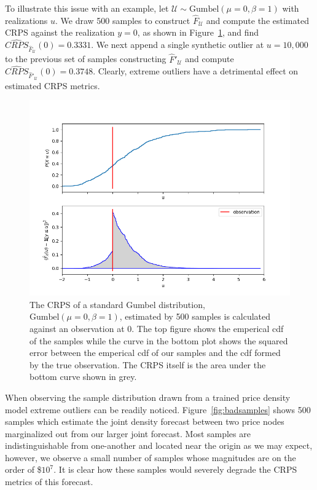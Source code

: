 To illustrate this issue with an example, let $\mathcal{U} \sim \text{Gumbel}(\mu=0, \beta=1)$ with realizations $u$.
We draw 500 samples to construct $\hat{F}_\mathcal{U}$ and compute the estimated CRPS against the realization $y=0$,
as shown in Figure~\ref{fig:gumbel_crps}, and find $\widehat{CRPS}_{\hat{F}_\mathcal{U}}(0) = 0.3331$.
We next append a single synthetic outlier at $u=10,000$ to the previous set of samples constructing
$\hat{F}'_\mathcal{U}$ and compute $\widehat{CRPS}_{\hat{F}'_\mathcal{U}}(0) = 0.3748$.
Clearly, extreme outliers have a detrimental effect on estimated CRPS metrics.

\begin{figure}[htbp]
    \caption[Example CRPS calculation of a standard Gumbel distribution]{
        The CRPS of a standard Gumbel distribution, $\text{Gumbel}(\mu=0, \beta=1)$, estimated by 500 samples is
        calculated against an observation at $0$.
        The top figure shows the emperical cdf of the samples while the curve in the bottom plot shows the squared error
        between the emperical cdf of our samples and the cdf formed by the true observation.
        The CRPS itself is the area under the bottom curve shown in grey.
    }
    \begin{center}
        \setlength{\fboxsep}{0pt}%
        \setlength{\fboxrule}{1pt}%
        \includegraphics[width=120mm]{figs/gumbel_crps}
    \end{center}
    \label{fig:gumbel_crps}
\end{figure}

When observing the sample distribution drawn from a trained price density model extreme outliers can be readily noticed.
Figure~\ref{fig:badsamples} shows 500 samples which estimate the joint density forecast between two price nodes
marginalized out from our larger joint forecast.
Most samples are indistinguishable from one-another and located near the origin as we may expect, however,
we observe a small number of samples whose magnitudes are on the order of \$$10^7$.
It is clear how these samples would severely degrade the CRPS metrics of this forecast.


